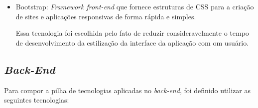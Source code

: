\documentclass[
    12pt,               %
    openright,          %
    oneside,
    a4paper,            %
    BIBLATEX,           %
    TODO,               %
    english,            %
    brazil              %
    ]{ifsp-spo-inf-ctds}
\begin{document}
\begin{itemize}
            \item Bootstrap:
                \emph{Framework front-end} que fornece estruturas de CSS para a criação de sites e aplicações responsivas de forma rápida e simples.
    
                Essa tecnologia foi escolhida pelo fato de reduzir consideravelmente o tempo de desenvolvimento da estilização da interface da aplicação com om usuário.
        
        \end{itemize}  

        \subsection{\emph{Back-End}}
    
            Para compor a pilha de tecnologias aplicadas no \emph{back-end}, foi definido utilizar as seguintes tecnologias:
\end{document}
